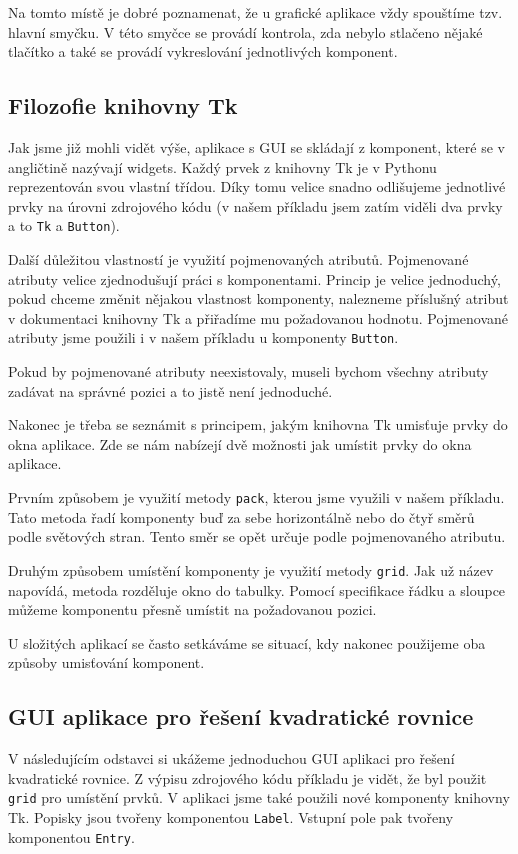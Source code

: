 Na tomto místě je dobré poznamenat, že u grafické aplikace vždy spou\-ští\-me tzv. hlavní smyčku. V této smyčce se provádí kontrola, zda nebylo stlačeno nějaké tlačítko a také se provádí vykreslování jednotlivých komponent.

\subsection{Filozofie knihovny Tk}
Jak jsme již mohli vidět výše, aplikace s GUI se skládají z komponent, které se v angličtině nazývají widgets. Každý prvek z knihovny Tk je v Pythonu reprezentován svou vlastní třídou. Díky tomu velice snadno odlišujeme jednotlivé prvky na úrovni zdrojového kódu (v našem příkladu jsem zatím viděli dva prvky a to \texttt{Tk} a \texttt{Button}). 

Další důležitou vlastností je využití pojmenovaných atributů. Pojmenované atributy velice zjednodušují práci s komponentami. Princip je velice jednoduchý, pokud chceme změnit nějakou vlastnost komponenty, nalezneme příslušný atribut v dokumentaci knihovny Tk a přiřadíme mu požadovanou hodnotu. Pojmenované atributy jsme použili i v našem pří\-kla\-du u komponenty \texttt{Button}.

Pokud by pojmenované atributy neexistovaly, museli bychom všechny atributy zadávat na správné pozici a to jistě není jednoduché.

Nakonec je třeba se seznámit s principem, jakým knihovna Tk umisťuje prvky do okna aplikace. Zde se nám nabízejí dvě možnosti jak umístit prvky do okna aplikace. 

Prvním způsobem je využití metody \texttt{pack}, kterou jsme využili v našem příkladu. Tato metoda řadí komponenty buď za sebe horizontálně nebo do čtyř směrů podle světových stran. Tento směr se opět určuje podle pojmenovaného atributu.

Druhým způsobem umístění komponenty je využití metody \texttt{grid}. Jak už název napovídá, metoda rozděluje okno do tabulky. Pomocí specifikace řádku a sloupce můžeme komponentu přesně umístit na požadovanou pozici.

U složitých aplikací se často setkáváme se situací, kdy nakonec použi\-je\-me oba způsoby umisťování komponent.

\subsection{GUI aplikace pro řešení kvadratické rovnice}
V následujícím odstavci si ukážeme jednoduchou GUI aplikaci pro řešení kvadratické rovnice. Z výpisu zdrojového kódu příkladu je vidět, že byl použit \texttt{grid} pro umístění prvků. V aplikaci jsme také použili nové komponenty knihovny Tk. Popisky jsou tvořeny komponentou \texttt{Label}. Vstupní pole pak tvořeny komponentou \texttt{Entry}.

